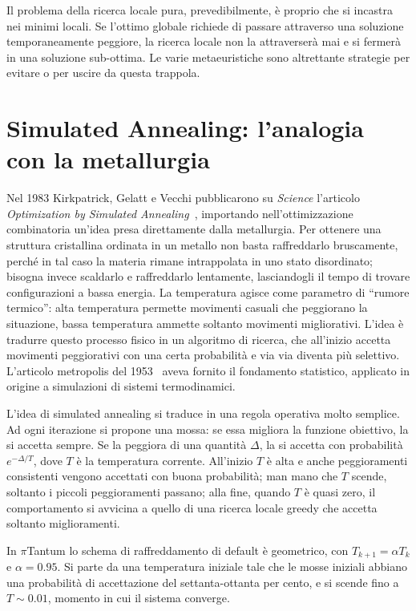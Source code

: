Il problema della ricerca locale pura, prevedibilmente, \`e
proprio che si incastra nei minimi locali. Se l'ottimo
globale richiede di passare attraverso una soluzione
temporaneamente peggiore, la ricerca locale non la
attraverser\`a mai e si fermer\`a in una soluzione
sub-ottima. Le varie metaeuristiche sono altrettante
strategie per evitare o per uscire da questa trappola.

\section{Simulated Annealing: l'analogia con la metallurgia}

\begin{storiabox}
Nel 1983 Kirkpatrick, Gelatt e Vecchi pubblicarono su
\emph{Science} l'articolo \emph{Optimization by Simulated
Annealing}~\parencite{kirkpatrick1983}, importando
nell'ottimizzazione combinatoria un'idea presa direttamente
dalla metallurgia. Per ottenere una struttura cristallina
ordinata in un metallo non basta raffreddarlo bruscamente,
perch\'e in tal caso la materia rimane intrappolata in uno
stato disordinato; bisogna invece scaldarlo e raffreddarlo
lentamente, lasciandogli il tempo di trovare configurazioni
a bassa energia. La temperatura agisce come parametro di
``rumore termico'': alta temperatura permette movimenti
casuali che peggiorano la situazione, bassa temperatura
ammette soltanto movimenti migliorativi. L'idea \`e tradurre
questo processo fisico in un algoritmo di ricerca, che
all'inizio accetta movimenti peggiorativi con una certa
probabilit\`a e via via diventa pi\`u selettivo. L'articolo
metropolis del 1953~\parencite{metropolis1953} aveva fornito
il fondamento statistico, applicato in origine a simulazioni
di sistemi termodinamici.
\end{storiabox}

L'idea di simulated annealing si traduce in una regola
operativa molto semplice. Ad ogni iterazione si propone
una mossa: se essa migliora la funzione obiettivo, la si
accetta sempre. Se la peggiora di una quantit\`a $\Delta$,
la si accetta con probabilit\`a $e^{-\Delta / T}$, dove $T$
\`e la temperatura corrente. All'inizio $T$ \`e alta e
anche peggioramenti consistenti vengono accettati con buona
probabilit\`a; man mano che $T$ scende, soltanto i piccoli
peggioramenti passano; alla fine, quando $T$ \`e quasi zero,
il comportamento si avvicina a quello di una ricerca locale
greedy che accetta soltanto miglioramenti.

In $\pi$Tantum lo schema di raffreddamento di default \`e
geometrico, con $T_{k+1} = \alpha T_k$ e $\alpha = 0.95$. Si
parte da una temperatura iniziale tale che le mosse iniziali
abbiano una probabilit\`a di accettazione del settanta-ottanta
per cento, e si scende fino a $T \sim 0.01$, momento in cui
il sistema converge.


